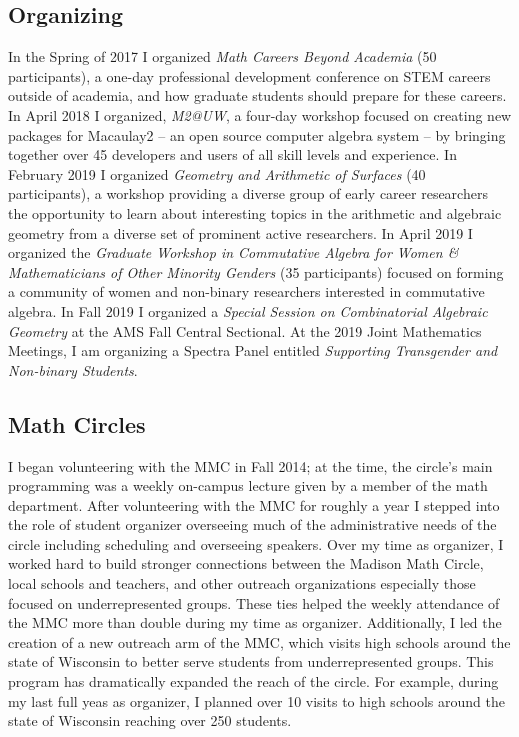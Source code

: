 \documentclass[10pt,reqno]{amsart}
\theoremstyle{remark}
\begin{document}
\subsection{Organizing}
In the Spring of 2017 I organized \textit{Math Careers Beyond Academia } (50 participants), a one-day professional development conference on STEM careers outside of academia, and how graduate students should prepare for these careers. In April 2018 I organized, \textit{M2@UW}, a four-day workshop focused on creating new packages for Macaulay2 -- an open source computer algebra system -- by bringing together over 45 developers and users of all skill levels and experience. In February 2019 I organized \textit{Geometry and Arithmetic of Surfaces} (40 participants), a workshop providing a diverse group of early career researchers the opportunity to learn about interesting topics in the arithmetic and algebraic geometry from a diverse set of prominent active researchers. In April 2019 I organized the \textit{Graduate Workshop in Commutative Algebra for Women \& Mathematicians of Other Minority Genders} (35 participants)  focused on forming a community of women and non-binary researchers interested in commutative algebra. In Fall 2019 I organized a \textit{Special Session on Combinatorial Algebraic Geometry} at the AMS Fall Central Sectional. At the 2019 Joint Mathematics Meetings, I am organizing a Spectra Panel entitled \textit{Supporting Transgender and Non-binary Students}. 

\subsection{Math Circles}
I began volunteering with the MMC in Fall 2014; at the time, the circle's main programming was a weekly on-campus lecture given by a member of the math department. After volunteering with the MMC for roughly a year I stepped into the role of student organizer overseeing much of the administrative needs of the circle including scheduling and overseeing speakers. Over my time as organizer, I worked hard to build stronger connections between the Madison Math Circle, local schools and teachers, and other outreach organizations especially those focused on underrepresented groups. These ties helped the weekly attendance of the MMC more than double during my time as organizer. Additionally, I led the creation of a new outreach arm of the MMC, which visits high schools around the state of Wisconsin to better serve students from underrepresented groups. This program has dramatically expanded the reach of the circle. For example, during my last full yeas as organizer, I planned over 10 visits to high schools around the state of Wisconsin reaching over 250 students. 
\end{document}
